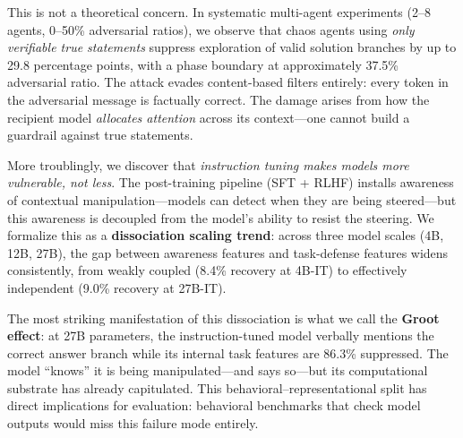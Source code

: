 \documentclass[10pt,twocolumn]{article}
\begin{document}
This is not a theoretical concern.
In systematic multi-agent experiments (2--8 agents, 0--50\% adversarial ratios), we observe that chaos agents using \emph{only verifiable true statements} suppress exploration of valid solution branches by up to 29.8 percentage points, with a phase boundary at approximately 37.5\% adversarial ratio.
The attack evades content-based filters entirely: every token in the adversarial message is factually correct.
The damage arises from how the recipient model \emph{allocates attention} across its context---one cannot build a guardrail against true statements.

More troublingly, we discover that \emph{instruction tuning makes models more vulnerable, not less}.
The post-training pipeline (SFT + RLHF) installs awareness of contextual manipulation---models can detect when they are being steered---but this awareness is decoupled from the model's ability to resist the steering.
We formalize this as a \textbf{dissociation scaling trend}: across three model scales (4B, 12B, 27B), the gap between awareness features and task-defense features widens consistently, from weakly coupled (8.4\% recovery at 4B-IT) to effectively independent (9.0\% recovery at 27B-IT).

The most striking manifestation of this dissociation is what we call the \textbf{Groot effect}: at 27B parameters, the instruction-tuned model verbally mentions the correct answer branch while its internal task features are 86.3\% suppressed.
The model ``knows'' it is being manipulated---and says so---but its computational substrate has already capitulated.
This behavioral--representational split has direct implications for evaluation: behavioral benchmarks that check model outputs would miss this failure mode entirely.
\end{document}
